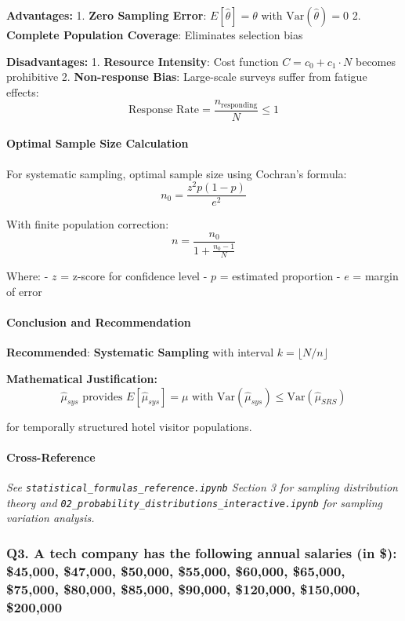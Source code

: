 \documentclass[11pt]{article}
\begin{document}
\textbf{Advantages:} 1. \textbf{Zero Sampling Error}:
\(E[\hat{\theta}] = \theta\) with \(\text{Var}(\hat{\theta}) = 0\) 2.
\textbf{Complete Population Coverage}: Eliminates selection bias

\textbf{Disadvantages:} 1. \textbf{Resource Intensity}: Cost function
\(C = c_0 + c_1 \cdot N\) becomes prohibitive 2. \textbf{Non-response
Bias}: Large-scale surveys suffer from fatigue effects:
\[\text{Response Rate} = \frac{n_{\text{responding}}}{N} \leq 1\]

\paragraph{Optimal Sample Size
Calculation}\label{optimal-sample-size-calculation}

For systematic sampling, optimal sample size using Cochran's formula:
\[n_0 = \frac{z^2 p(1-p)}{e^2}\]

With finite population correction:
\[n = \frac{n_0}{1 + \frac{n_0 - 1}{N}}\]

Where: - \(z\) = z-score for confidence level - \(p\) = estimated
proportion - \(e\) = margin of error

\paragraph{Conclusion and
Recommendation}\label{conclusion-and-recommendation}

\textbf{Recommended}: \textbf{Systematic Sampling} with interval
\(k = \lfloor N/n \rfloor\)

\textbf{Mathematical Justification:}
\[\hat{\mu}_{sys} \text{ provides } E[\hat{\mu}_{sys}] = \mu \text{ with } \text{Var}(\hat{\mu}_{sys}) \leq \text{Var}(\hat{\mu}_{SRS})\]

for temporally structured hotel visitor populations.

\paragraph{Cross-Reference}\label{cross-reference}

\emph{See \texttt{statistical\_formulas\_reference.ipynb} Section 3 for
sampling distribution theory and
\texttt{02\_probability\_distributions\_interactive.ipynb} for sampling
variation analysis.}

    \subsubsection{Q3. A tech company has the following annual salaries (in
\$): \$45,000, \$47,000, \$50,000, \$55,000, \$60,000, \$65,000,
\$75,000, \$80,000, \$85,000, \$90,000, \$120,000, \$150,000,
\$200,000}\label{q3.-a-tech-company-has-the-following-annual-salaries-in-45000-47000-50000-55000-60000-65000-75000-80000-85000-90000-120000-150000-200000}
\end{document}
